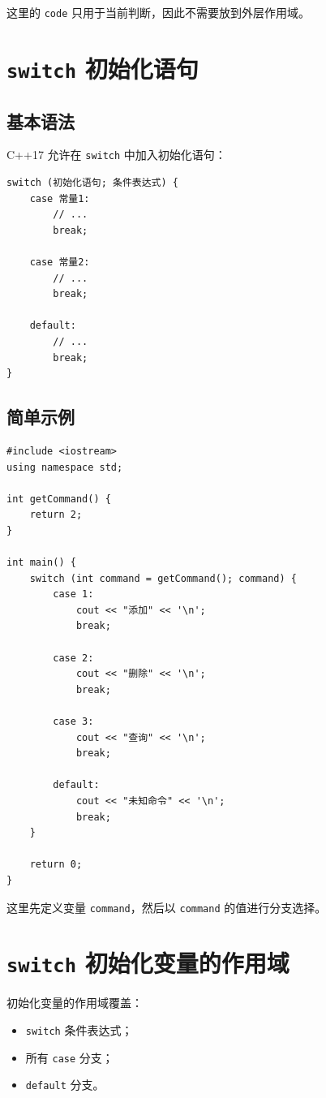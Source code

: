 \documentclass[UTF8,12pt,a4paper]{ctexart}
\begin{document}
这里的 \texttt{code} 只用于当前判断，因此不需要放到外层作用域。


\section{\texttt{switch} 初始化语句}

\subsection{基本语法}

C++17 允许在 \texttt{switch} 中加入初始化语句：

\begin{lstlisting}
switch (初始化语句; 条件表达式) {
    case 常量1:
        // ...
        break;

    case 常量2:
        // ...
        break;

    default:
        // ...
        break;
}
\end{lstlisting}

\subsection{简单示例}

\begin{lstlisting}
#include <iostream>
using namespace std;

int getCommand() {
    return 2;
}

int main() {
    switch (int command = getCommand(); command) {
        case 1:
            cout << "添加" << '\n';
            break;

        case 2:
            cout << "删除" << '\n';
            break;

        case 3:
            cout << "查询" << '\n';
            break;

        default:
            cout << "未知命令" << '\n';
            break;
    }

    return 0;
}
\end{lstlisting}

这里先定义变量 \texttt{command}，然后以 \texttt{command} 的值进行分支选择。

\section{\texttt{switch} 初始化变量的作用域}

初始化变量的作用域覆盖：

\begin{itemize}
    \item \texttt{switch} 条件表达式；
    \item 所有 \texttt{case} 分支；
    \item \texttt{default} 分支。
\end{itemize}
\end{document}
